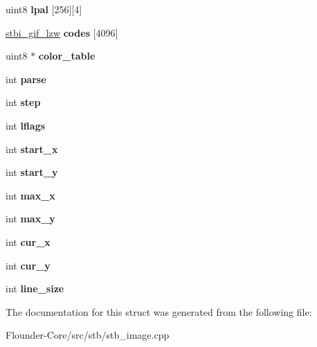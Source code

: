 \begin{DoxyCompactItemize}
\mbox{\label{structstbi__gif__struct_af2bf4a7890065ce54b8b59c6fd008e5f}} 
uint8 {\bfseries lpal} \mbox{[}256\mbox{]}\mbox{[}4\mbox{]}
\item 
\mbox{\label{structstbi__gif__struct_a4644d2fe2c84e410ab235ea415e9a740}} 
\hyperlink{structstbi__gif__lzw__struct}{stbi\+\_\+gif\+\_\+lzw} {\bfseries codes} \mbox{[}4096\mbox{]}
\item 
\mbox{\label{structstbi__gif__struct_aa10fee29a36ac4b9cae98300f839d091}} 
uint8 $\ast$ {\bfseries color\+\_\+table}
\item 
\mbox{\label{structstbi__gif__struct_a7a57ec19955875d52af26851ef332db8}} 
int {\bfseries parse}
\item 
\mbox{\label{structstbi__gif__struct_a61556e0a3ff8f19fa80401de5da1f079}} 
int {\bfseries step}
\item 
\mbox{\label{structstbi__gif__struct_a01e6981357bbd283177f70f87050a49d}} 
int {\bfseries lflags}
\item 
\mbox{\label{structstbi__gif__struct_ad3899ad3323686e963a7322e9a80bb05}} 
int {\bfseries start\+\_\+x}
\item 
\mbox{\label{structstbi__gif__struct_a7f4974b80d6e6f4f56b5fd02a9c1c121}} 
int {\bfseries start\+\_\+y}
\item 
\mbox{\label{structstbi__gif__struct_a02391438194b161d16bdf95878be6a66}} 
int {\bfseries max\+\_\+x}
\item 
\mbox{\label{structstbi__gif__struct_aff3410e0fff097d4719e54096f6da69b}} 
int {\bfseries max\+\_\+y}
\item 
\mbox{\label{structstbi__gif__struct_adbc7ae7e9ff2e2abdf66eb0e1a4b3ffb}} 
int {\bfseries cur\+\_\+x}
\item 
\mbox{\label{structstbi__gif__struct_ac61865216c4b578c235f5b8170c2036c}} 
int {\bfseries cur\+\_\+y}
\item 
\mbox{\label{structstbi__gif__struct_a5b7d7625c253025ff5ee4169afbf06b7}} 
int {\bfseries line\+\_\+size}
\end{DoxyCompactItemize}


The documentation for this struct was generated from the following file\+:\begin{DoxyCompactItemize}
\item 
Flounder-\/\+Core/src/stb/stb\+\_\+image.\+cpp\end{DoxyCompactItemize}
